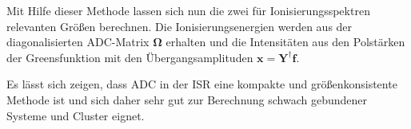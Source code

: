 Mit Hilfe dieser Methode lassen sich nun die zwei für Ionisierungsspektren relevanten Größen berechnen. Die Ionisierungsenergien werden aus der diagonalisierten ADC-Matrix $\mathbf{\Omega}$ erhalten und die Intensitäten aus den Polstärken der Greensfunktion mit den Übergangsamplituden $\mathbf{x}=\mathbf{Y}^\dagger\mathbf{f}$.

Es lässt sich zeigen, dass ADC in der ISR eine kompakte und größenkonsistente Methode ist und sich daher sehr gut zur Berechnung schwach gebundener Systeme und Cluster eignet.\cite{Mertins96_1}


\begin{figure}[h]
  \centering
  
  \caption{}
  \label{}
\end{figure}
